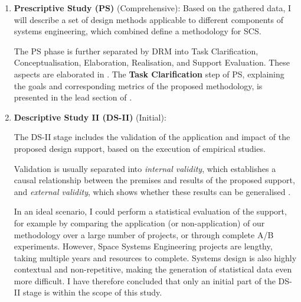 \documentclass[a4paper,nobib,justified,final]{tufte-book}
\begin{document}
\begin{enumerate}
	For this work, four different internal space missions were investigated, as shown in . More details about the result acquisition and evaluation process are detailed in the lead section of .
	
	\item
	\textbf{Prescriptive Study (PS)} (Comprehensive):
	Based on the gathered data, I will describe a set of design methods applicable to different components of systems engineering, which combined define a methodology for \acs{SCS}.
	
	The PS phase is further separated by \acs{DRM} into Task Clarification, Conceptualisation, Elaboration, Realisation, and Support Evaluation. These aspects are elaborated in . The \textbf{Task Clarification} step of PS, explaining the goals and corresponding metrics of the proposed methodology, is presented in the lead section of .
	
	\item 
	\textbf{Descriptive Study II (DS-II)} (Initial):

	The DS-II stage includes the validation of the application and impact of the proposed design support, based on the execution of empirical studies.
	
	Validation is usually separated into \emph{internal validity}, which establishes a causal relationship between the premises and results of the proposed support, and \emph{external validity}, which shows whether these results can be generalised \autocite{yinCaseStudyResearch2014}.
	
	In an ideal scenario, I could perform a statistical evaluation of the support, for example by comparing the application (or non-application) of our methodology over a large number of projects, or through complete A/B experiments. However,  Space Systems Engineering projects are lengthy, taking multiple years and resources to complete. Systems design is also highly contextual and non-repetitive, making the generation of statistical data even more difficult. I have therefore concluded that only an initial part of the DS-II stage is within the scope of this study.
	

\end{enumerate}
\end{document}
